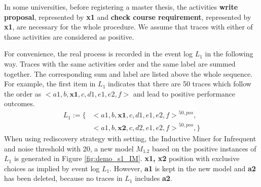 In some universities, before registering a master thesis, the activities \textbf{write proposal}, represented by \textbf{x1}  and \textbf{check course requirement}, represented by \textbf{x1}, are necessary for the whole procedure. We assume that traces with either of those activities are considered as positive.  

For convenience, the real process is recorded in the event log $L_1$ in the following way. Traces with the same activities order and the same label are summed together. The corresponding sum and label are listed above the whole sequence. For example, the first item in $L_1$ indicates that there are 50 traces which follow the order as ${<a1, b, \textbf{x1},c, d1, e1, e2, f>}$ and lead to positive performance outcomes.
\begin{align*}
		L_1:= \{ &  {<a1, b, \textbf{x1},c, d1, e1, e2, f>}^{50, pos}, \\   
		  &{<a1, b, \textbf{x2},c, d2, e1, e2, f>}^{50,pos},
		\}
		\end{align*}
When using rediscovery strategy with setting, the Inductive Miner for Infrequent and noise threshold with 20, a new  model $M_{1.2}$ based on the positive instances of $L_1$ is generated in Figure \ref{fig:demo_s1_IM}. \textbf{x1, x2} position with exclusive choices as implied by event log $L_1$. However, \textbf{a1} is kept in the new model and \textbf{a2} has been deleted, because no traces in $L_1$ includes \textbf{a2}.
		
